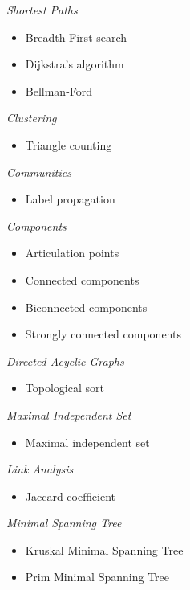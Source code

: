 \begin{multicols}{3}
      \emph{Shortest Paths}
      \begin{itemize}
            \item Breadth-First search
            \item Dijkstra's algorithm
            \item Bellman-Ford
      \end{itemize}
      \emph{Clustering}
      \begin{itemize}
            \item Triangle counting
      \end{itemize}
      \emph{Communities}
      \begin{itemize}
            \item Label propagation
      \end{itemize}
\columnbreak
      \emph{Components}
      \begin{itemize}
            \item Articulation points
            \item Connected components
            \item Biconnected components
            \item Strongly connected components  
      \end{itemize}
      \emph{Directed Acyclic Graphs}
      \begin{itemize}
            \item Topological sort
      \end{itemize}
\columnbreak
      \emph{Maximal Independent Set}
      \begin{itemize}
            \item Maximal independent set
      \end{itemize}
      \emph{Link Analysis}
      \begin{itemize}
            \item Jaccard coefficient
      \end{itemize}
      \emph{Minimal Spanning Tree}
      \begin{itemize}
            \item Kruskal Minimal Spanning Tree
            \item Prim Minimal Spanning Tree
      \end{itemize}

\vfill\null
\end{multicols}


